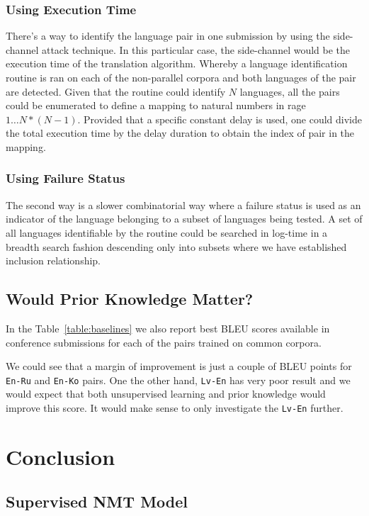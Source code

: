 \documentclass[]{article}
\begin{document}
\subsubsection{Using Execution Time}

There's a way to identify the language pair in one submission by using the side-channel attack technique.
In this particular case, the side-channel would be the execution time of the translation algorithm.
Whereby a language identification routine is ran on each of the non-parallel corpora and both languages of the pair are detected.
Given that the routine could identify $N$ languages, all the pairs could be enumerated to define a mapping to natural numbers in rage $1\dots N*(N-1)$.
Provided that a specific constant delay is used, one could divide the total execution time by the delay duration to obtain the index of pair in the mapping.

\subsubsection{Using Failure Status}

The second way is a slower combinatorial way where a failure status is used as an indicator of the language belonging to a subset of languages being tested.
A set of all languages identifiable by the routine could be searched in log-time in a breadth search fashion descending only into subsets where we have established inclusion relationship.

\subsection{Would Prior Knowledge Matter?}
\label{sect:prior}

In the Table~\ref{table:baselines} we also report best BLEU scores available in conference submissions for each of the pairs trained on common corpora.

We could see that a margin of improvement is just a couple of BLEU points for {\tt En-Ru} and {\tt En-Ko} pairs.
One the other hand, {\tt Lv-En} has very poor result and we would expect that both unsupervised learning and prior knowledge would improve this score.
It would make sense to only investigate the {\tt Lv-En} further.

\section{Conclusion}

\small




\begin{appendices}
\section{Supervised NMT Model}
\label{appendix:supervised}

\end{appendices}
\end{document}
